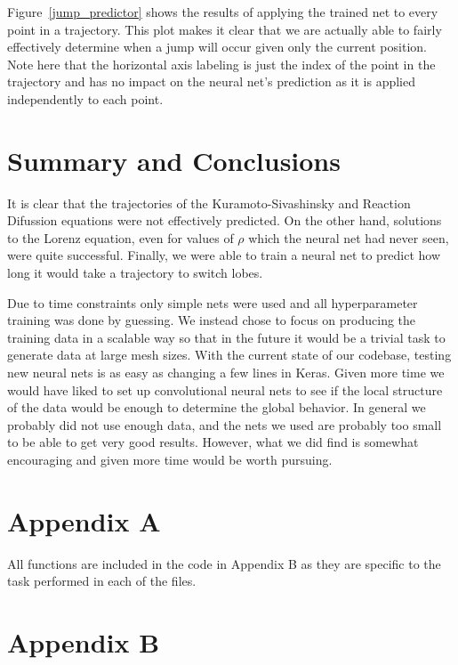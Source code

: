 \documentclass[10pt]{article}
\begin{document}
Figure~\ref{jump_predictor} shows the results of applying the trained net to every point in a trajectory. This plot makes it clear that we are actually able to fairly effectively determine when a jump will occur given only the current position. Note here that the horizontal axis labeling is just the index of the point in the trajectory and has no impact on the neural net's prediction as it is applied independently to each point.

\pagebreak
\section{Summary and Conclusions}
It is clear that the trajectories of the Kuramoto-Sivashinsky and Reaction Difussion equations were not effectively predicted. On the other hand, solutions to the Lorenz equation, even for values of \( \rho \) which the neural net had never seen, were quite successful. Finally, we were able to train a neural net to predict how long it would take a trajectory to switch lobes.

Due to time constraints only simple nets were used and all hyperparameter training was done by guessing. We instead chose to focus on producing the training data in a scalable way so that in the future it would be a trivial task to generate data at large mesh sizes. With the current state of our codebase, testing new neural nets is as easy as changing a few lines in Keras. Given more time we would have liked to set up convolutional neural nets to see if the local structure of the data would be enough to determine the global behavior. In general we probably did not use enough data, and the nets we used are probably too small to be able to get very good results. However, what we did find is somewhat encouraging and given more time would be worth pursuing.





\onecolumn
\section{Appendix A}
\label{AppendixA}
All functions are included in the code in Appendix B as they are specific to the task performed in each of the files.

\section{Appendix B}






\end{document}
